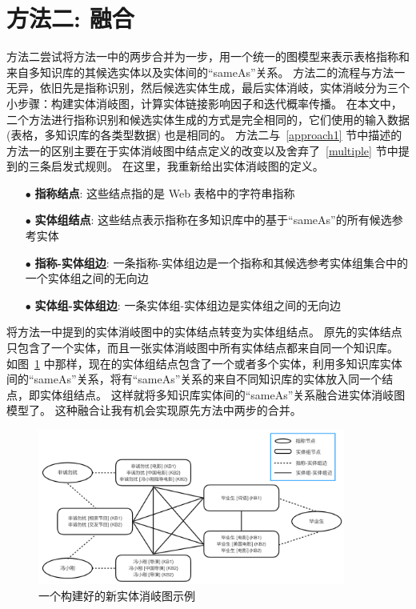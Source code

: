 \section{方法二: 融合}\label{approach2}
方法二尝试将方法一中的两步合并为一步，用一个统一的图模型来表示表格指称和来自多知识库的其候选实体以及实体间的``sameAs''关系。
方法二的流程与方法一无异，依旧先是指称识别，然后候选实体生成，最后实体消岐，实体消岐分为三个小步骤：构建实体消岐图，计算实体链接影响因子和迭代概率传播。
在本文中，二个方法进行指称识别和候选实体生成的方式是完全相同的，它们使用的输入数据 (表格，多知识库的各类型数据) 也是相同的。
方法二与~\ref{approach1} 节中描述的方法一的区别主要在于实体消岐图中结点定义的改变以及舍弃了~\ref{multiple} 节中提到的三条启发式规则。
在这里，我重新给出实体消岐图的定义。
\begin{itemize}
  \item[$\bullet$] \textbf{指称结点}: 这些结点指的是 Web 表格中的字符串指称
  \item[$\bullet$] \textbf{实体组结点}: 这些结点表示指称在多知识库中的基于``sameAs''的所有候选参考实体
  \item[$\bullet$] \textbf{指称-实体组边}: 一条指称-实体组边是一个指称和其候选参考实体组集合中的一个实体组之间的无向边
  \item[$\bullet$] \textbf{实体组-实体组边}: 一条实体组-实体组边是实体组之间的无向边
\end{itemize}
将方法一中提到的实体消岐图中的实体结点转变为实体组结点。
原先的实体结点只包含了一个实体，而且一张实体消岐图中所有实体结点都来自同一个知识库。
如图~\ref{edg2} 中那样，现在的实体组结点包含了一个或者多个实体，利用多知识库实体间的``sameAs''关系，将有``sameAs''关系的来自不同知识库的实体放入同一个结点，即实体组结点。
这样就将多知识库实体间的``sameAs''关系融合进实体消岐图模型了。
这种融合让我有机会实现原先方法中两步的合并。

\begin{figure}[htbp]
\centering
\includegraphics[width=0.9\textwidth]{img/edg2}
\caption{一个构建好的新实体消岐图示例}
\label{edg2}
\end{figure}


